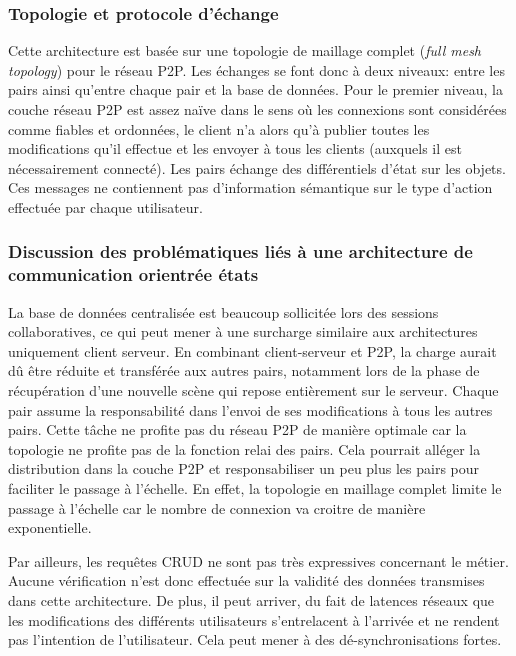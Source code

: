 \subsubsection{Topologie et protocole d'échange}
Cette architecture est basée sur une topologie de maillage complet (\textit{full 
mesh topology}) pour le réseau \gls{P2P}.
Les échanges se font donc à deux niveaux: entre les pairs ainsi qu'entre chaque 
pair et la base de données. Pour le premier niveau, la couche réseau \gls{P2P} est 
assez 
naïve dans le sens où les connexions sont considérées comme fiables et 
ordonnées, le client n'a alors qu'à publier toutes les modifications qu'il effectue et 
les envoyer à tous les clients (auxquels il est nécessairement connecté).
Les pairs échange des différentiels d'état sur les objets. Ces messages ne 
contiennent pas d'information sémantique sur le type d'action effectuée par chaque 
utilisateur. 

\subsubsection{Discussion des problématiques liés à une architecture de 
communication orientrée \og états\fg{}}

La base de données centralisée est beaucoup sollicitée lors des sessions 
collaboratives, ce qui peut mener à une surcharge similaire aux architectures 
uniquement client serveur. 
En combinant client-serveur et \gls{P2P}, la charge aurait dû être réduite et 
transférée aux autres pairs, notamment lors de la phase de récupération d'une 
nouvelle scène qui repose entièrement sur le serveur. 
Chaque pair assume la responsabilité dans l'envoi de ses modifications à tous les 
autres pairs. Cette tâche ne profite pas du réseau \gls{P2P} de manière optimale 
car la topologie ne profite pas de la fonction relai des pairs. Cela pourrait alléger  la 
distribution dans la couche \gls{P2P} et responsabiliser un peu plus les pairs pour 
faciliter le passage à l'échelle.
En effet, la topologie en maillage complet limite le passage à l'échelle car le 
nombre de connexion va croitre de manière exponentielle. 

Par ailleurs, les requêtes \gls{CRUD} ne sont pas très expressives concernant le 
métier. 
Aucune vérification n'est donc effectuée sur la validité des données transmises 
dans cette architecture. De plus, il peut arriver, du fait de latences réseaux que les 
modifications des différents utilisateurs s'entrelacent à l'arrivée et ne rendent pas 
l'intention de l'utilisateur. Cela peut mener à des dé-synchronisations fortes.

